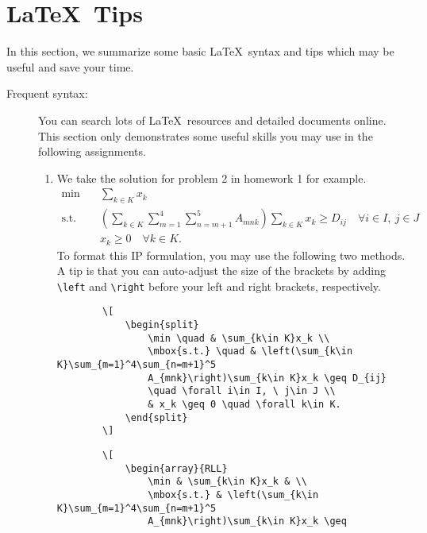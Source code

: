 \documentclass{OR_SolutionTheme}
\begin{document}
\section{\LaTeX \ Tips}\label{sec:latex}
In this section, we summarize some basic \LaTeX \ syntax
and tips which may be useful and save your time.
\begin{description}
    \item[Frequent syntax:]
    You can search lots of \LaTeX \ resources and 
    detailed documents online. 
    This section only demonstrates some useful skills 
    you may use in the following assignments.
    \begin{enumerate}
        \item We take the solution for problem 2 in homework 1 for example.
        \[
            \begin{split}
                \min \quad & \sum_{k\in K}x_k \\
                \mbox{s.t.} \quad & \left(\sum_{k\in K}\sum_{m=1}^4\sum_{n=m+1}^5
                A_{mnk}\right)\sum_{k\in K}x_k \geq D_{ij}
                \quad \forall i\in I, \ j\in J \\
                & x_k \geq 0 \quad \forall k\in K.
            \end{split}
        \]
        To format this IP formulation, you may use the following two methods.
        A tip is that you can auto-adjust the size of 
        the brackets by adding 
        \texttt{\textbackslash left} and
        \texttt{\textbackslash right} 
        before your left and right brackets,
        respectively.
        \begin{verbatim}
        \[
            \begin{split}
                \min \quad & \sum_{k\in K}x_k \\
                \mbox{s.t.} \quad & \left(\sum_{k\in K}\sum_{m=1}^4\sum_{n=m+1}^5
                A_{mnk}\right)\sum_{k\in K}x_k \geq D_{ij}
                \quad \forall i\in I, \ j\in J \\
                & x_k \geq 0 \quad \forall k\in K.
            \end{split}
        \]
        \end{verbatim}
        \begin{verbatim}
        \[
            \begin{array}{RLL}
                \min & \sum_{k\in K}x_k & \\
                \mbox{s.t.} & \left(\sum_{k\in K}\sum_{m=1}^4\sum_{n=m+1}^5
                A_{mnk}\right)\sum_{k\in K}x_k \geq

\end{verbatim}
\end{enumerate}
\end{description}
\end{document}
